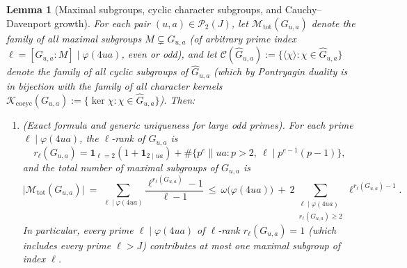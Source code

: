 \documentclass[11pt, a4paper]{article}
\theoremstyle{plain}
\newtheorem{lemma}[theorem]{Lemma}
\theoremstyle{definition}
\begin{document}
\begin{lemma}[Maximal subgroups, cyclic character subgroups, and Cauchy--Davenport growth]\label{lem:total_maximal_subgroups}
For each pair $(u,a)\in\mathcal{P}_2(J)$, let $\mathcal{M}_{\mathrm{tot}}(G_{u,a})$ denote the family of \emph{all} maximal subgroups $M\subsetneq G_{u,a}$ (of arbitrary prime index $\ell=[G_{u,a}:M]\mid\varphi(4ua)$, even or odd), and let $\mathcal{C}(\widehat{G}_{u,a}):=\allowbreak\{\langle\chi\rangle:\allowbreak\chi\in\widehat{G}_{u,a}\}$ denote the family of all cyclic subgroups of $\widehat{G}_{u,a}$ (which by Pontryagin duality is in bijection with the family of all character kernels $\mathcal{K}_{\mathrm{cocyc}}(G_{u,a}):=\allowbreak\{\ker\chi:\allowbreak\chi\in\widehat{G}_{u,a}\}$). Then:
\begin{enumerate}[label=(\alph*)]
    \item \emph{(Exact formula and generic uniqueness for large odd primes).} 
    For each prime $\ell\mid\varphi(4ua)$, the $\ell$-rank of $G_{u,a}$ is 
    \[
    r_\ell(G_{u,a})=\mathbf{1}_{\ell=2}(1+\mathbf{1}_{2\mid ua})+\#\big\{p^{e}\parallel ua:p>2,\ \ell\mid p^{e-1}(p-1)\big\},
    \]
    and the total number of maximal subgroups of $G_{u,a}$ is
    \begin{equation}\label{eq:Mtot_exact_formula}
    \big|\mathcal{M}_{\mathrm{tot}}(G_{u,a})\big|\ =\ \sum_{\ell\mid\varphi(4ua)}\frac{\ell^{r_\ell(G_{u,a})}-1}{\ell-1}\ \le\ \omega\big(\varphi(4ua)\big)\ +\ 2\sum_{\substack{\ell\mid\varphi(4ua)\\ r_\ell(G_{u,a})\ge2}}\ell^{r_\ell(G_{u,a})-1}.
    \end{equation}
    In particular, every prime $\ell\mid\varphi(4ua)$ of $\ell$-rank $r_\ell(G_{u,a})=1$ (which includes every prime $\ell>J$) contributes \emph{at most one} maximal subgroup of index $\ell$.
    

\end{enumerate}
\end{lemma}
\end{document}
